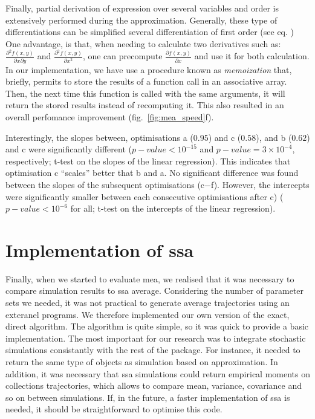 \documentclass[11pt,a4paper]{article}
\newcommand{\citationneeded}[2][]{\todo[color=brown, fancyline, #1]{\textbf{Citation Needed:} #2}}
\begin{document}
Finally, partial derivation of expression over several variables and order is extensively performed during the approximation.
Generally, these type of differentiations can be simplified several differentiation of first order (see eq. \citationneeded{eq})
One advantage, is that, when needing to calculate two derivatives such as: $\frac{\partial{} ^ 2 f(x,y)}{\partial{} x \partial{} y}$ and $\frac{\partial{} ^ 2 f(x,y)}{\partial{} x^2}$,
one can precompute $\frac{\partial{} f(x,y)}{\partial{} x}$ and use it for both calculation.
In our implementation, we have use a procedure known as \emph{memoization} that, briefly, permits to store the results of a function call in an associative array.
Then, the next time this function is called with the same arguments, it will return the stored results instead of recomputing it.
This also resulted in an overall perfomance improvement (fig.~\ref{fig:mea_speed}f).

Interestingly, the slopes between, optimisations a ($0.95$) and c ($0.58$), and b ($0.62$) and c were significantly different ($p-value <10^{-15}$ and $p-value = 3 \times 10^{-4}$, respectively;
t-test on the slopes of the linear regression). This indicates that optimisation c ``scales'' better that b and a.
No significant difference was found between the slopes of the subsequent optimisations (c$-$f). 
However, the intercepts were significantly smaller between each consecutive optimisations after c) ($p-value < 10^{-6}$ for all; t-test on the intercepts of the linear regression).


\section{Implementation of \acrlong{ssa}}
Finally, when we started to evaluate \gls{mea}, we realised that it was necessary to compare simulation results to \gls{ssa}\cite{gillespie_general_1976} average.
Considering the number of parameter sets we needed, it was not practical to generate average trajectories using an exteranel programs.
We therefore implemented our own version of the exact, direct algorithm.
The algorithm is quite simple, so it was quick to provide a basic implementation. 
The most important for our research was to integrate stochastic simulations consistantly with the rest of the package.
For instance, it needed to return the same type of objects as simulation based on approximation. 
In addition, it was necessary that \gls{ssa} simulations could return empirical moments on collections trajectories, which allows to compare mean, variance, covariance and so on between simulations.
If, in the future, a faster implementation of \gls{ssa} is needed, it should be straightforward to optimise this code. 


\newpage{}
{}

\end{document}
